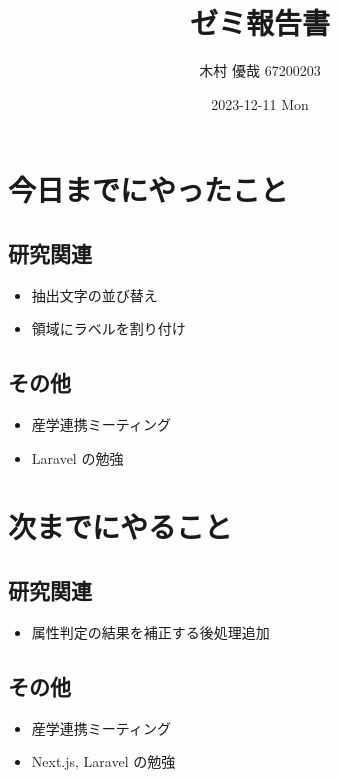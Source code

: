\documentclass[uplatex, onecolumn, 10pt]{jsarticle}
\begin{document}
\title{\vspace{-40mm}\bf{\LARGE{ゼミ報告書}}}
\author{\vspace{-40mm}木村 優哉 67200203}
\date{2023-12-11 Mon}
\maketitle


\section{今日までにやったこと}

\subsection*{研究関連}
\begin{itemize}
	\item 抽出文字の並び替え
	\item 領域にラベルを割り付け
\end{itemize}

\subsection*{その他}
\begin{itemize}
	\item 産学連携ミーティング
	\item Laravel の勉強
\end{itemize}


\section{次までにやること}

\subsection*{研究関連}
\begin{itemize}
	\item 属性判定の結果を補正する後処理追加
\end{itemize}

\subsection*{その他}
\begin{itemize}
	\item 産学連携ミーティング
	\item Next.js, Laravel の勉強
\end{itemize}
\end{document}
